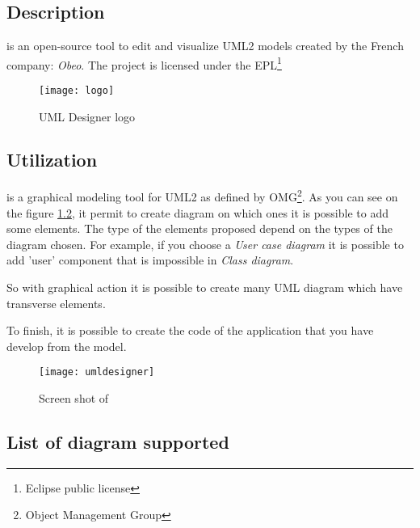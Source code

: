 \chapter{\umld}
\label{chap:UMLDesigner}

\section{Description}

\umld is an open-source tool to edit and visualize UML2 models created by the French company:
\textit{Obeo}. The project is licensed under the EPL\footnote{Eclipse public license}

\begin{figure}[h] \centering
  \texttt{[image: logo]}
  \caption{UML Designer logo}
  \label{fig:logo}
\end{figure}

\section{Utilization}

\umld is a graphical modeling tool for UML2 as defined by OMG\footnote{Object Management Group\cite{omg}}. As
you can see on the figure \ref{fig:umldesigner}, it permit to create diagram on which ones it is
possible to add some elements. The type of the elements proposed depend on the types of the diagram
chosen. For example, if you choose a \textit{User case diagram} it is possible to add 'user'
component that is impossible in \textit{Class diagram}.

So with graphical action it is possible to create many UML diagram which have transverse elements.

To finish, it is possible to create the code of the application that you have develop from the
model.


\begin{figure}[h] \centering
  \texttt{[image: umldesigner]}
  \caption{Screen shot of \umld}
  \label{fig:umldesigner}
\end{figure}



\section{List of diagram supported}

